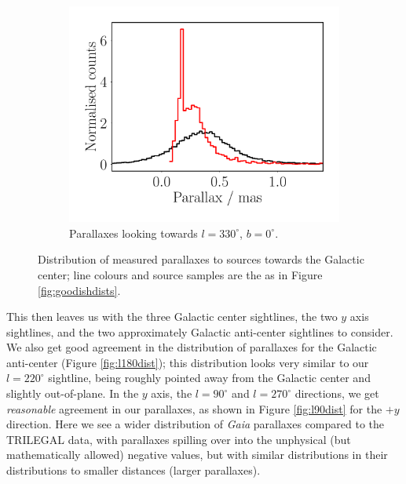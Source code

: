\documentclass[fleqn,usenatbib]{mnras}
\begin{document}
\begin{figure}
\begin{subfigure}[b]{0.3\textwidth}
        \label{fig:l30dist}
    \end{subfigure}
    \begin{subfigure}[b]{0.3\textwidth}
        \centering
        \includegraphics[width=\textwidth]{Plots/plot_dist_gaia_330_0_18.pdf}
        \caption{Parallaxes looking towards $l = 330^\circ$, $b = 0^\circ$.}
        \label{fig:l330dist}
    \end{subfigure}
    \caption{Distribution of measured parallaxes to sources towards the Galactic center; line colours and source samples are the as in Figure \ref{fig:goodishdists}.}
    \label{fig:badishdists}
\end{figure}

This then leaves us with the three Galactic center sightlines, the two $y$ axis sightlines, and the two approximately Galactic anti-center sightlines to consider.
We also get good agreement in the distribution of parallaxes for the Galactic anti-center (Figure \ref{fig:l180dist}); this distribution looks very similar to our $l = 220^\circ$ sightline, being roughly pointed away from the Galactic center and slightly out-of-plane.
In the $y$ axis, the $l = 90^\circ$ and $l = 270^\circ$ directions, we get \textit{reasonable} agreement in our parallaxes, as shown in Figure \ref{fig:l90dist} for the $+y$ direction.
Here we see a wider distribution of \textit{Gaia} parallaxes compared to the TRILEGAL data, with parallaxes spilling over into the unphysical (but mathematically allowed) negative values, but with similar distributions in their distributions to smaller distances (larger parallaxes).
\end{document}
